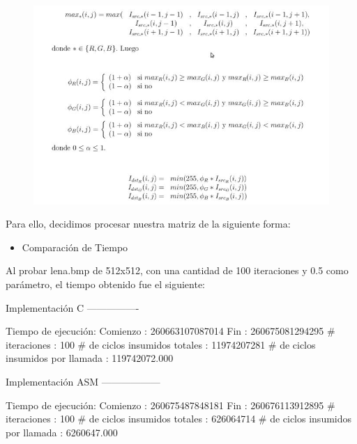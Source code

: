 \documentclass[10pt, a4paper]{article}
\begin{document}
\begin{itemize}
\begin{figure}[H] %
\begin{center}
\includegraphics[width=400pt]{./colorizar.jpg}
\end{center}
\end{figure}

Para ello, decidimos procesar nuestra matriz de la siguiente forma:\newline
\begin{itemize}
\item{Comparación de Tiempo}
\end{itemize}
Al probar lena.bmp de 512x512, con una cantidad de 100 iteraciones y 0.5 como parámetro, el tiempo obtenido fue el siguiente:\newline

Implementación C\newline
----------------

Tiempo de ejecución:\newline
  Comienzo                          : 260663107087014\newline
  Fin                               : 260675081294295\newline
  \# iteraciones                     : 100\newline
  \# de ciclos insumidos totales     : 11974207281\newline
  \# de ciclos insumidos por llamada : 119742072.000\newline

Implementación ASM\newline
------------------

Tiempo de ejecución:\newline
  Comienzo                          : 260675487848181\newline
  Fin                               : 260676113912895\newline
  \# iteraciones                     : 100\newline
  \# de ciclos insumidos totales     : 626064714\newline
  \# de ciclos insumidos por llamada : 6260647.000\newline


\end{itemize}
\end{document}

